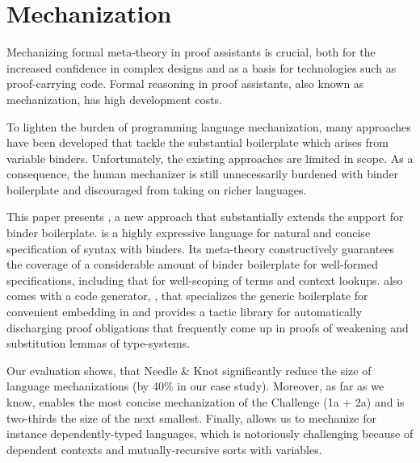 
\section{Mechanization}
Mechanizing formal meta-theory in proof assistants is crucial, both for the
increased confidence in complex designs and as a basis for technologies such as
proof-carrying code.  Formal reasoning in proof assistants, also known as
mechanization, has high development costs.

To lighten the burden of programming language mechanization, many
approaches have been developed that tackle the substantial boilerplate which
arises from variable binders. Unfortunately, the existing approaches are limited
in scope.
As a consequence, the human mechanizer is still unnecessarily burdened with
binder boilerplate and discouraged from taking on richer languages.

This paper presents \Knot, a new approach that substantially extends the support
for binder boilerplate. \Knot is a highly expressive language for natural and
concise specification of syntax with binders. Its meta-theory constructively
guarantees the coverage of a considerable amount of binder boilerplate for
well-formed specifications, including that for well-scoping of terms and context
lookups. \Knot also comes with a code generator, \Needle, that specializes the
generic boilerplate for convenient embedding in \Coq and provides a tactic
library for automatically discharging proof obligations that frequently come up
in proofs of weakening and substitution lemmas of type-systems.

Our evaluation shows, that Needle \& Knot significantly reduce the size of
language mechanizations (by 40\% in our case study). Moreover, as far as we
know, \Knot enables the most concise mechanization of the \POPLmark Challenge
(1a + 2a) and is two-thirds the size of the next smallest. Finally, \Knot allows
us to mechanize for instance dependently-typed languages, which is notoriously
challenging because of dependent contexts and mutually-recursive sorts with
variables.

